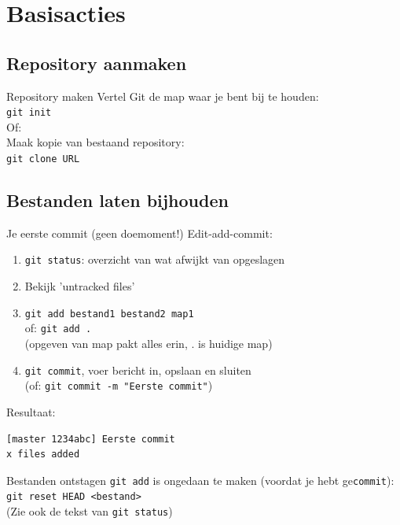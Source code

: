 \section{Basisacties}

\subsection{Repository aanmaken}
\begin{frame}[fragile]{Repository maken}
	Vertel Git de map waar je bent bij te houden:\\

	\texttt{git init}\\

	Of:\\

	Maak kopie van bestaand repository:\\

	\texttt{git clone URL}
\end{frame}

\subsection{Bestanden laten bijhouden}
\begin{frame}[fragile]{Je eerste commit (geen doemoment!)}
	Edit-add-commit:
	\begin{enumerate}
		\item \texttt{git status}: overzicht van wat afwijkt van opgeslagen
		\item Bekijk 'untracked files'
		\item \texttt{git add bestand1 bestand2 map1}\\ of:
			\texttt{git add .}\\
			(opgeven van map pakt alles erin, . is huidige map)
		\item \texttt{git commit}, voer bericht in, opslaan en sluiten\\
			(of: \texttt{git commit -m "Eerste commit"})
	\end{enumerate}
	Resultaat:
	\begin{verbatim}
[master 1234abc] Eerste commit
x files added
	\end{verbatim}
\end{frame}

\begin{frame}{Bestanden ontstagen}
	\texttt{git add} is ongedaan te maken (voordat je hebt ge\texttt{commit}):\\
	\texttt{git reset HEAD <bestand>}\\
	(Zie ook de tekst van \texttt{git status})
\end{frame}

